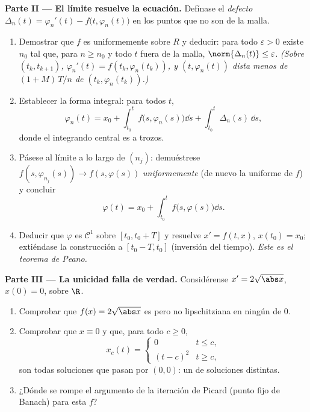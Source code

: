 \begin{problem}[{Problema de fin de semana --- existencia de soluciones
de
$x' = f(t, x)$ sin hipótesis de Lipschitz}]
\medskip
\noindent\textbf{Parte II --- El límite resuelve la ecuación.} Defínase
el \emph{defecto} $\Delta_n(t) = \varphi_n'(t) -
f\bigl(t, \varphi_n(t)\bigr)$ en los puntos que no son de la malla.
\begin{enumerate}[resume]
  \item Demostrar que $f$ es uniformemente
   sobre $R$ y deducir:
  para todo $\varepsilon > 0$ existe $n_0$ tal que, para $n \geq n_0$ y
  todo $t$ fuera de la malla, $\norm{\Delta_n(t)} \leq \varepsilon$.
  \emph{(Sobre $(t_k,
        t_{k+1})$, $\varphi_n'(t) = f(t_k, \varphi_n(t_k))$, y
  $(t, \varphi_n(t))$ dista menos de $(1 + M)\,T/n$ de
  $(t_k, \varphi_n(t_k))$.)} \item Establecer la forma integral: para
  todos $t$,
        \[
        \varphi_n(t) = x_0 + \int_{t_0}^{t}
        f\bigl(s, \varphi_n(s)\bigr)\dd s +
        \int_{t_0}^t \Delta_n(s)\,\dd s,
        \]
        donde el integrando central es
         a trozos. \item
        Pásese al límite a lo largo de $(n_j)$: demuéstrese
        $f(s, \varphi_{n_j}(s)) \to f(s, \varphi(s))$
        \emph{uniformemente} (de nuevo la
         uniforme de
        $f$) y concluir
        \[
        \varphi(t) = x_0 + \int_{t_0}^t
        f\bigl(s, \varphi(s)\bigr)\dd s .
        \]
  \item Deducir que $\varphi$ es $\mathcal C^1$ sobre $[t_0, t_0 +
        T]$ y resuelve $x' = f(t, x)$, $x(t_0) = x_0$; extiéndase la
  construcción a $[t_0 - T, t_0]$ (inversión del tiempo). \emph{Este es
  el teorema de Peano.}
\end{enumerate}

\medskip
\noindent\textbf{Parte III --- La unicidad falla de verdad.}
Considérense $x' = 2\sqrt{\abs x}$, $x(0) = 0$, sobre $\R$.
\begin{enumerate}[resume]
  \item Comprobar que $f(x) = 2\sqrt{\abs x}$ es
   pero no lipschitziana en
  ningún  de $0$. \item
  Comprobar que $x \equiv 0$ y que, para todo $c \geq 0$,
        \[
        x_c(t) = \begin{cases} 0 & t \leq c,\\ (t - c)^2 & t
        \geq c,\end{cases}
        \]
        son todas soluciones que pasan por $(0,0)$: un  de
        soluciones distintas. \item ¿Dónde se rompe el argumento de la
        iteración de Picard (punto fijo de Banach) para esta $f$?
\end{enumerate}


\end{problem}
